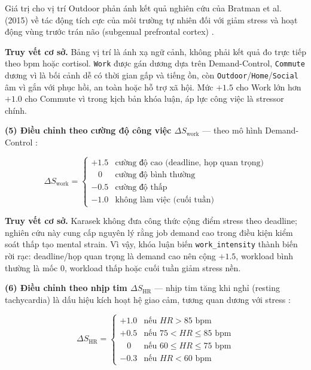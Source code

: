 Giá trị cho vị trí Outdoor phản ánh kết quả nghiên cứu của Bratman et al. (2015) về tác động tích cực của môi trường tự nhiên đối với giảm stress và hoạt động vùng trước trán não (subgenual prefrontal cortex) \cite{bratman2015nature}.

\textbf{Truy vết cơ sở.} Bảng vị trí là ánh xạ ngữ cảnh, không phải kết quả đo trực tiếp theo bpm hoặc cortisol. \texttt{Work} được gán dương dựa trên Demand-Control, \texttt{Commute} dương vì là bối cảnh dễ có thời gian gấp và tiếng ồn, còn \texttt{Outdoor}/\texttt{Home}/\texttt{Social} âm vì gắn với phục hồi, an toàn hoặc hỗ trợ xã hội. Mức $+1.5$ cho Work lớn hơn $+1.0$ cho Commute vì trong kịch bản khóa luận, áp lực công việc là stressor chính.

\textbf{(5) Điều chỉnh theo cường độ công việc $\Delta S_{\text{work}}$} — theo mô hình Demand-Control \cite{karasek1979job}:

\begin{equation}
    \Delta S_{\text{work}} = \begin{cases}
        +1.5  & \text{cường độ cao (deadline, họp quan trọng)} \\
        \;\;\; 0    & \text{cường độ bình thường} \\
        -0.5  & \text{cường độ thấp} \\
        -1.0  & \text{không làm việc (cuối tuần)}
    \end{cases}
\end{equation}

\textbf{Truy vết cơ sở.} Karasek không đưa công thức cộng điểm stress theo deadline; nghiên cứu này cung cấp nguyên lý rằng job demand cao trong điều kiện kiểm soát thấp tạo mental strain. Vì vậy, khóa luận biến \texttt{work\_intensity} thành biến rời rạc: deadline/họp quan trọng là demand cao nên cộng $+1.5$, workload bình thường là mốc 0, workload thấp hoặc cuối tuần giảm stress nền.

\textbf{(6) Điều chỉnh theo nhịp tim $\Delta S_{\text{HR}}$} — nhịp tim tăng khi nghỉ (resting tachycardia) là dấu hiệu kích hoạt hệ giao cảm, tương quan dương với stress \cite{hovsepian2015cstress}:

\begin{equation}
    \Delta S_{\text{HR}} = \begin{cases}
        +1.0  & \text{nếu } HR > 85 \text{ bpm} \\
        +0.5  & \text{nếu } 75 < HR \leq 85 \text{ bpm} \\
        \;\;\; 0    & \text{nếu } 60 \leq HR \leq 75 \text{ bpm} \\
        -0.3  & \text{nếu } HR < 60 \text{ bpm}
    \end{cases}
\end{equation}


